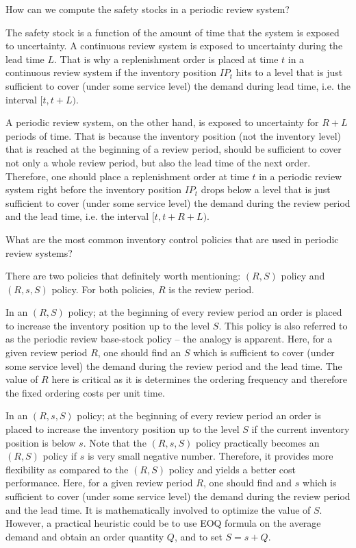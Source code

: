 \begin{exercise}
How can we compute the safety stocks in a periodic review system?


\begin{solution}
The safety stock is a function of the amount of time that the system is exposed to uncertainty. A continuous review system is exposed to uncertainty during the lead time $L$. That is why a replenishment order is placed at time $t$ in a continuous review system if the inventory position $IP_t$ hits to a level that is just sufficient to cover (under some service level) the demand during lead time, i.e. the interval $[t,t+L)$. 

A periodic review system, on the other hand, is exposed to uncertainty for $R+L$ periods of time. That is because the inventory position (not the inventory level) that is reached at the beginning of a review period, should be sufficient to cover not only a whole review period, but also the lead time of the next order. Therefore, one should place a replenishment order at time $t$ in a periodic review system right before the inventory position $IP_t$ drops below a level that is just sufficient to cover (under some service level) the demand during the review period and the lead time, i.e. the interval $[t,t+R+L)$. 
\end{solution}
\end{exercise}

\begin{exercise}
What are the most common inventory control policies that are used in periodic review systems?


\begin{solution}
There are two policies that definitely worth mentioning: $(R,S)$ policy and $(R,s,S)$ policy. For both policies, $R$ is the review period. 

In an $(R,S)$ policy; at the beginning of every review period an order is placed to increase the inventory position up to the level $S$. This policy is also referred to as the periodic review base-stock policy -- the analogy is apparent. Here, for a given review period $R$, one should find an $S$ which is sufficient to cover (under some service level) the demand during the review period and the lead time. The value of $R$ here is critical as it is determines the ordering frequency and therefore the fixed ordering costs per unit time.

In an $(R,s,S)$ policy; at the beginning of every review period an order is placed to increase the inventory position up to the level $S$ if the current inventory position is below $s$. Note that the $(R,s,S)$ policy practically becomes an $(R,S)$ policy if $s$ is very small negative number. Therefore, it provides more flexibility as compared to the $(R,S)$ policy and yields a better cost performance. Here, for a given review period $R$, one should find and $s$ which is sufficient to cover (under some service level) the demand during the review period and the lead time. It is mathematically involved to optimize the value of $S$. However, a practical heuristic could be to use EOQ formula on the average demand and obtain an order quantity $Q$, and to set $S=s+Q$.
\end{solution}
\end{exercise}

